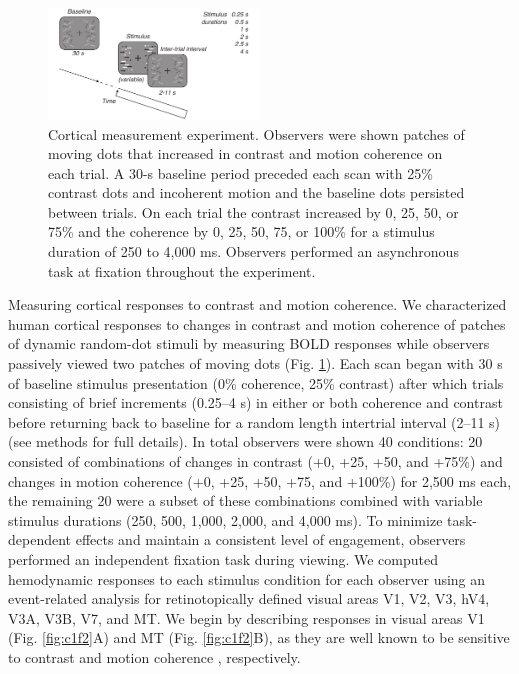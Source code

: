 \documentclass{report}
\begin{document}
\begin{figure}[ht]
\centering
\includegraphics[keepaspectratio,width=0.5\textwidth]{figs_c1/Fig1_task.pdf}
\caption[Cortical measurement experiment.]{Cortical measurement experiment. Observers were shown patches of moving dots that increased in contrast and motion coherence on each trial. A 30-s baseline period preceded each scan with 25\% contrast dots and incoherent motion and the baseline dots persisted between trials. On each trial the contrast increased by 0, 25, 50, or 75\% and the coherence by 0, 25, 50, 75, or 100\% for a stimulus duration of 250 to 4,000 ms. Observers performed an asynchronous task at fixation throughout the experiment.}
\label{fig:c1f1}
\end{figure}

Measuring cortical responses to contrast and motion coherence.
We characterized human cortical responses to changes in contrast and motion coherence of patches of dynamic random-dot stimuli by measuring BOLD responses while observers passively viewed two patches of moving dots (Fig. \ref{fig:c1f1}). Each scan began with 30 s of baseline stimulus presentation (0\% coherence, 25\% contrast) after which trials consisting of brief increments (0.25–4 s) in either or both coherence and contrast before returning back to baseline for a random length intertrial interval (2–11 s) (see methods for full details). In total observers were shown 40 conditions: 20 consisted of combinations of changes in contrast (+0, +25, +50, and +75\%) and changes in motion coherence (+0, +25, +50, +75, and +100\%) for 2,500 ms each, the remaining 20 were a subset of these combinations combined with variable stimulus durations (250, 500, 1,000, 2,000, and 4,000 ms). To minimize task-dependent effects and maintain a consistent level of engagement, observers performed an independent fixation task during viewing. We computed hemodynamic responses to each stimulus condition for each observer using an event-related analysis for retinotopically defined visual areas V1, V2, V3, hV4, V3A, V3B, V7, and MT. We begin by describing responses in visual areas V1 (Fig. \ref{fig:c1f2}A) and MT (Fig. \ref{fig:c1f2}B), as they are well known to be sensitive to contrast \citep{Avidan2002-jg,Boynton1996-ff,Gardner2005-pg,Logothetis2001-kk,Olman2004-dd,Tootell1995-gq,Tootell1998-mr} and motion coherence \citep{Britten1993-oh,Handel2007-xk,Rees2000-ul,Simoncelli1998-ts}, respectively.
\end{document}
